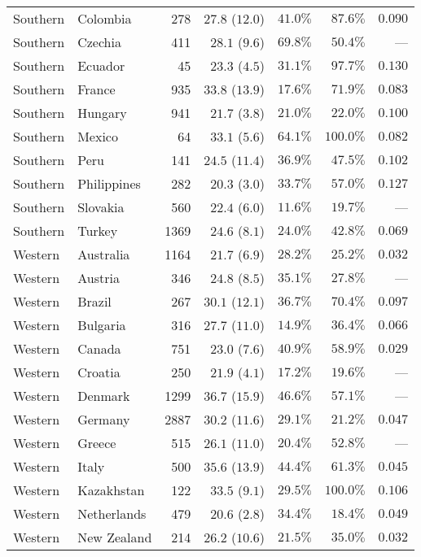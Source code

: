 \documentclass[
]{article}
\begin{document}
\begin{longtable}{llrrrrr}
Southern & Colombia & 278 & $27.8$ ($12.0$) & $41.0\%$ & $87.6\%$ & $0.090$ \\ 
Southern & Czechia & 411 & $28.1$ ($9.6$) & $69.8\%$ & $50.4\%$ & --- \\ 
Southern & Ecuador & 45 & $23.3$ ($4.5$) & $31.1\%$ & $97.7\%$ & $0.130$ \\ 
Southern & France & 935 & $33.8$ ($13.9$) & $17.6\%$ & $71.9\%$ & $0.083$ \\ 
Southern & Hungary & 941 & $21.7$ ($3.8$) & $21.0\%$ & $22.0\%$ & $0.100$ \\ 
Southern & Mexico & 64 & $33.1$ ($5.6$) & $64.1\%$ & $100.0\%$ & $0.082$ \\ 
Southern & Peru & 141 & $24.5$ ($11.4$) & $36.9\%$ & $47.5\%$ & $0.102$ \\ 
Southern & Philippines & 282 & $20.3$ ($3.0$) & $33.7\%$ & $57.0\%$ & $0.127$ \\ 
Southern & Slovakia & 560 & $22.4$ ($6.0$) & $11.6\%$ & $19.7\%$ & --- \\ 
Southern & Turkey & 1369 & $24.6$ ($8.1$) & $24.0\%$ & $42.8\%$ & $0.069$ \\ 
Western & Australia & 1164 & $21.7$ ($6.9$) & $28.2\%$ & $25.2\%$ & $0.032$ \\ 
Western & Austria & 346 & $24.8$ ($8.5$) & $35.1\%$ & $27.8\%$ & --- \\ 
Western & Brazil & 267 & $30.1$ ($12.1$) & $36.7\%$ & $70.4\%$ & $0.097$ \\ 
Western & Bulgaria & 316 & $27.7$ ($11.0$) & $14.9\%$ & $36.4\%$ & $0.066$ \\ 
Western & Canada & 751 & $23.0$ ($7.6$) & $40.9\%$ & $58.9\%$ & $0.029$ \\ 
Western & Croatia & 250 & $21.9$ ($4.1$) & $17.2\%$ & $19.6\%$ & --- \\ 
Western & Denmark & 1299 & $36.7$ ($15.9$) & $46.6\%$ & $57.1\%$ & --- \\ 
Western & Germany & 2887 & $30.2$ ($11.6$) & $29.1\%$ & $21.2\%$ & $0.047$ \\ 
Western & Greece & 515 & $26.1$ ($11.0$) & $20.4\%$ & $52.8\%$ & --- \\ 
Western & Italy & 500 & $35.6$ ($13.9$) & $44.4\%$ & $61.3\%$ & $0.045$ \\ 
Western & Kazakhstan & 122 & $33.5$ ($9.1$) & $29.5\%$ & $100.0\%$ & $0.106$ \\ 
Western & Netherlands & 479 & $20.6$ ($2.8$) & $34.4\%$ & $18.4\%$ & $0.049$ \\ 
Western & New Zealand & 214 & $26.2$ ($10.6$) & $21.5\%$ & $35.0\%$ & $0.032$ \\ 

\end{longtable}
\end{document}
